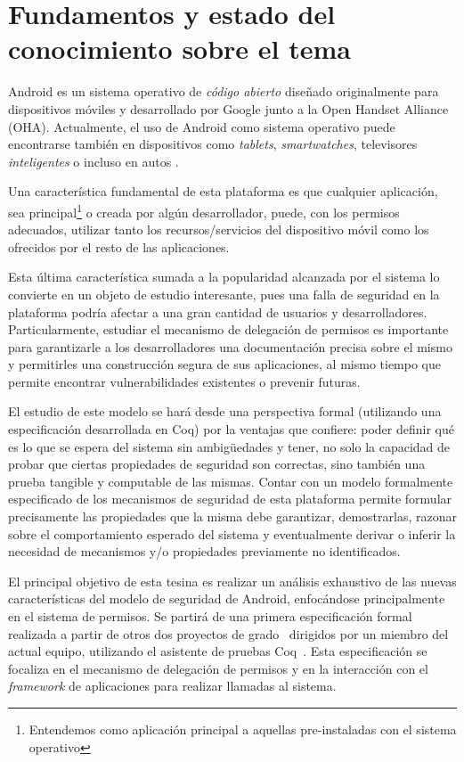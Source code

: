 \section{Fundamentos y estado del conocimiento sobre el tema}

Android es un sistema operativo de \textit{código abierto} diseñado
originalmente para dispositivos móviles y desarrollado por Google junto a la
Open Handset Alliance (OHA). Actualmente, el uso de Android como sistema
operativo puede encontrarse también en dispositivos como \textit{tablets},
\textit{smartwatches}, televisores \textit{inteligentes} o incluso en autos
\cite{android-car}.

Una característica fundamental de esta plataforma es que cualquier aplicación,
sea principal\footnote{Entendemos como aplicación principal a aquellas
pre-instaladas con el sistema operativo} o creada por algún desarrollador,
puede, con los permisos adecuados, utilizar tanto los recursos/servicios del
dispositivo móvil como los ofrecidos por el resto de las aplicaciones.

Esta última característica sumada a la popularidad alcanzada por el sistema lo
convierte en un objeto de estudio interesante, pues una falla de seguridad en la
plataforma podría afectar a una gran cantidad de usuarios y desarrolladores.
Particularmente, estudiar el mecanismo de delegación de permisos es importante
para garantizarle a los desarrolladores una documentación precisa sobre el mismo
y permitirles una construcción segura de sus aplicaciones, al mismo tiempo que
permite encontrar vulnerabilidades existentes o prevenir futuras.

El estudio de este modelo se hará desde una perspectiva formal (utilizando una
especificación desarrollada en Coq) por la ventajas que confiere: poder definir
qué es lo que se espera del sistema sin ambigüedades y tener, no solo la
capacidad de probar que ciertas propiedades de seguridad son correctas, sino
también una prueba tangible y computable de las mismas. Contar con un modelo
formalmente especificado de los mecanismos de seguridad de esta plataforma
permite formular precisamente las propiedades que la misma debe garantizar,
demostrarlas, razonar sobre el comportamiento esperado del sistema y
eventualmente derivar o inferir la necesidad de mecanismos y/o propiedades
previamente no identificados.

El principal objetivo de esta tesina es realizar un análisis exhaustivo de las
nuevas características del modelo de seguridad de Android, enfocándose
principalmente en el sistema de permisos. Se partirá de una primera
especificación formal realizada a partir de otros dos proyectos de
grado~\cite{fgorostiaga, aromano} dirigidos por un miembro del actual equipo,
utilizando el asistente de pruebas Coq~\cite{coq}. Esta especificación se
focaliza en el mecanismo de delegación de permisos y en la interacción con el
\textit{framework} de aplicaciones para realizar llamadas al sistema.

